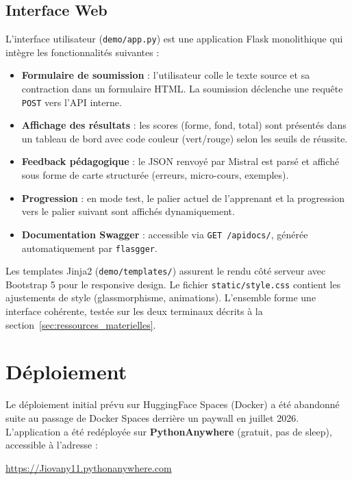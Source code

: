 \subsection{Interface Web}

L'interface utilisateur (\texttt{demo/app.py}) est une application Flask monolithique qui intègre les fonctionnalités suivantes :

\begin{itemize}
    \item \textbf{Formulaire de soumission} : l'utilisateur colle le texte source et sa contraction dans un formulaire HTML. La soumission déclenche une requête \texttt{POST} vers l'API interne.
    \item \textbf{Affichage des résultats} : les scores (forme, fond, total) sont présentés dans un tableau de bord avec code couleur (vert/rouge) selon les seuils de réussite.
    \item \textbf{Feedback pédagogique} : le JSON renvoyé par Mistral est parsé et affiché sous forme de carte structurée (erreurs, micro-cours, exemples).
    \item \textbf{Progression} : en mode test, le palier actuel de l'apprenant et la progression vers le palier suivant sont affichés dynamiquement.
    \item \textbf{Documentation Swagger} : accessible via \texttt{GET /apidocs/}, générée automatiquement par \texttt{flasgger}.
\end{itemize}

Les templates Jinja2 (\texttt{demo/templates/}) assurent le rendu côté serveur avec Bootstrap 5 pour le responsive design. Le fichier \texttt{static/style.css} contient les ajustements de style (glassmorphisme, animations). L'ensemble forme une interface cohérente, testée sur les deux terminaux décrits à la section~\ref{sec:ressources_materielles}.

\section{Déploiement}

Le déploiement initial prévu sur HuggingFace Spaces (Docker) a été abandonné suite au passage de Docker Spaces derrière un paywall en juillet 2026. L'application a été redéployée sur \textbf{PythonAnywhere} (gratuit, pas de sleep), accessible à l'adresse :
\begin{center}
\url{https://Jiovany11.pythonanywhere.com}
\end{center}

